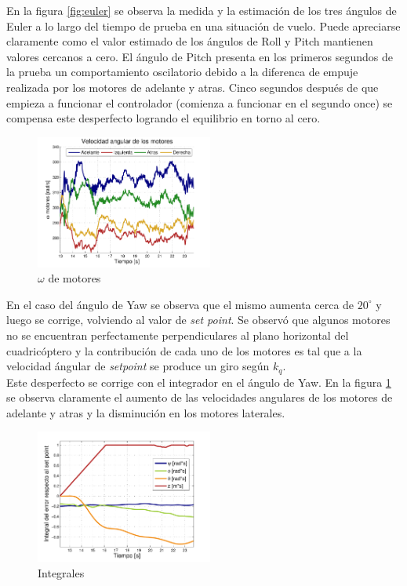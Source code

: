 \documentclass[main]{subfiles}
\begin{document}
En la figura \ref{fig:euler} se observa la medida y la estimaci\'on de los tres \'angulos de Euler a lo largo del tiempo de prueba en una situaci\'on de vuelo. Puede apreciarse claramente como el valor estimado de los \'angulos de Roll y Pitch mantienen valores cercanos a cero. El \'angulo de Pitch presenta en los primeros segundos de la prueba un comportamiento oscilatorio debido a la diferenca de empuje realizada por los motores de adelante y atras. Cinco segundos después de que empieza a funcionar el controlador (comienza a funcionar en el segundo once) se compensa este desperfecto logrando el equilibrio en torno al cero.

\begin{figure}
	\centering
	\vspace{-15pt}
	\includegraphics[width=0.52\textwidth]{./pics_test_control/w.pdf}
	\vspace{-15pt}
	\caption{$\omega$ de motores}
	\vspace{-20pt}
	\label{fig:w}
\end{figure}

En el caso del \'angulo de Yaw se observa que el mismo aumenta cerca de $20 ^\circ$ y luego se corrige, volviendo al valor de \emph{set point}. Se observ\'o que algunos motores no se encuentran perfectamente perpendiculares al plano horizontal del cuadric\'optero y la contribuci\'on de cada uno de los motores es tal que a la velocidad \'angular de \emph{setpoint} se produce un giro seg\'un $k_q$.\\ 

Este desperfecto se corrige con el integrador en el \'angulo de Yaw. En la figura \ref{fig:w} se observa claramente el aumento de las velocidades angulares de los motores de adelante y atras y la disminuci\'on en los motores laterales.\\ 

\begin{figure}
	\centering
	\vspace{-10pt}
	\includegraphics[width=0.52\textwidth]{./pics_test_control/int.pdf}
	\caption{Integrales}
	\label{fig:int}
\end{figure}
\end{document}
